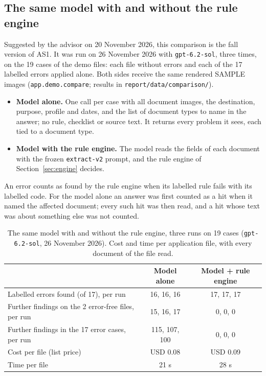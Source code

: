 \subsection{The same model with and without the rule engine}\label{sec:model-comparison}
Suggested by the advisor on 20 November 2026, this comparison is the fall version of AS1. It was run
on 26 November 2026 with \texttt{gpt-6.2-sol}, three times, on the 19 cases of the demo files: each
file without errors and each of the 17 labelled errors applied alone. Both sides receive the same
rendered SAMPLE images (\texttt{app.demo.compare}; results in \texttt{report/data/comparison/}).
\begin{itemize}
  \item \textbf{Model alone.} One call per case with all document images, the destination, purpose,
    profile and dates, and the list of document types to name in the answer; no rule, checklist or
    source text. It returns every problem it sees, each tied to a document type.
  \item \textbf{Model with the rule engine.} The model reads the fields of each document with the
    frozen \texttt{extract-v2} prompt, and the rule engine of Section~\ref{sec:engine} decides.
\end{itemize}
An error counts as found by the rule engine when its labelled rule fails with its labelled code. For
the model alone an answer was first counted as a hit when it named the affected document; every
such hit was then read, and a hit whose text was about something else was not counted.

\begin{table}[ht]
  \centering
  \caption{The same model with and without the rule engine, three runs on 19 cases
    (\texttt{gpt-6.2-sol}, 26 November 2026). Cost and time per application file, with every
    document of the file read.}\label{tab:model-comparison}
  \small
  \begin{tabular}{p{}cc}
    \toprule
    & Model alone & Model + rule engine \\
    \midrule
    Labelled errors found (of 17), per run & 16, 16, 16 & 17, 17, 17 \\
    Further findings on the 2 error-free files, per run & 15, 16, 17 & 0, 0, 0 \\
    Further findings in the 17 error cases, per run & 115, 107, 100 & 0, 0, 0 \\
    Cost per file (list price) & USD 0.08 & USD 0.09 \\
    Time per file & 21 s & 28 s \\
    \bottomrule
  \end{tabular}
\end{table}

